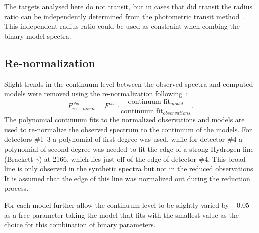The targets analysed here do not transit, but in cases that did transit the radius ratio can be independently determined from the photometric transit method~\citep{deeg_photometric_1998}.
This independent radius ratio could be used as constraint when combing the binary model spectra.


\subsection{Re-normalization}
\label{subsec:renorm}
Slight trends in the continuum level between the observed spectra and computed models were removed using the re-normalization following~\citet{passegger_fundamental_2016}:
\begin{equation}
F^{obs}_{re-norm} = F^{obs} \cdot \frac{\textrm{continuum fit}_{model}}{\textrm{continuum fit}_{observations}}.
\end{equation}
The polynomial continuum fits to the normalized observations and models are used to re-normalize the observed spectrum to the continuum of the models.
For detectors \#1--3 a polynomial of first degree was used, while for detector \#4 a polynomial of second degree was needed to fit the edge of a strong Hydrogen line (Brackett-\(\gamma\)) at 2166\nm{}, which lies just off of the edge of detector \#4.
This broad line is only observed in the synthetic spectra but not in the reduced observations.
It is assumed that the edge of this line was normalized out during the reduction process.

For each model  further allow the continuum level to be slightly varied by \(\pm 0.05\) as a free parameter taking the model that fits with the smallest \textchisquared{} value as the choice for this combination of binary parameters.


